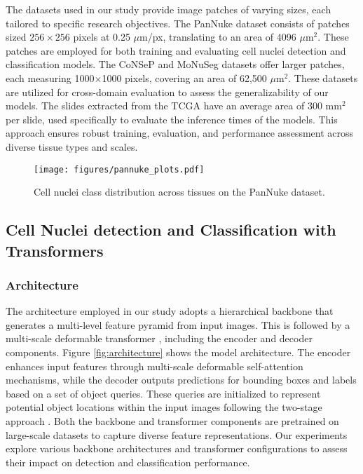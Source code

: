 
The datasets used in our study provide image patches of varying sizes, each tailored to specific research objectives. The PanNuke dataset consists of patches sized $256 \times 256$ pixels at 0.25 $\mu$m/px, translating to an area of 4096 $\mu$m$^2$. These patches are employed for both training and evaluating cell nuclei detection and classification models. The CoNSeP and MoNuSeg datasets offer larger patches, each measuring 1000$\times$1000 pixels, covering an area of 62,500 $\mu$m$^2$. These datasets are utilized for cross-domain evaluation to assess the generalizability of our models. The slides extracted from the TCGA have an average area of 300 mm$^2$ per slide, used specifically to evaluate the inference times of the models. This approach ensures robust training, evaluation, and performance assessment across diverse tissue types and scales.

\begin{figure}
    \centering
    \texttt{[image: figures/pannuke\_plots.pdf]}
    \caption{Cell nuclei class distribution across tissues on the PanNuke dataset.}
    \label{fig:pannuke-stats}
\end{figure}

\subsection{Cell Nuclei detection and Classification with Transformers}
\label{sec:methods:CellNuc-DETR}

\subsubsection{Architecture}
\label{sec:methods:CellNuc-DETR:architecture}

The architecture employed in our study adopts a hierarchical backbone that generates a multi-level feature pyramid from input images. This is followed by a multi-scale deformable transformer \cite{zhu2020deformable}, including the encoder and decoder components. Figure \ref{fig:architecture} shows the model architecture. The encoder enhances input features through multi-scale deformable self-attention mechanisms, while the decoder outputs predictions for bounding boxes and labels based on a set of object queries. These queries are initialized to represent potential object locations within the input images following the two-stage approach  \cite{zhu2020deformable}. Both the backbone and transformer components are pretrained on large-scale datasets to capture diverse feature representations. Our experiments explore various backbone architectures and transformer configurations to assess their impact on detection and classification performance.

